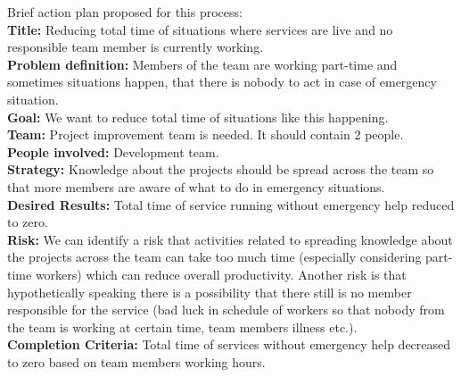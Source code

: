 Brief action plan proposed for this process: \\
\textbf{Title:} Reducing total time of situations where services are live and no responsible team member is currently working.\\
\textbf{Problem definition:} Members of the team are working part-time and sometimes situations happen, that there is nobody to act in case of emergency situation.\\
\textbf{Goal:}  We want to reduce total time of situations like this happening.\\
\textbf{Team:} Project improvement team is needed. It should contain 2 people.\\
\textbf{People involved:} Development team.\\
\textbf{Strategy:} Knowledge about the projects should be spread across the team so that more members are aware of what to do in emergency situations.\\
\textbf{Desired Results:} Total time of service running without emergency help reduced to zero.\\
\textbf{Risk:} We can identify a risk that activities related to spreading knowledge about the projects across the team can take too much time (especially considering part-time workers) which can reduce overall productivity. Another risk is that hypothetically speaking there is a possibility that there still is no member responsible for the service (bad luck in schedule of workers so that nobody from the team is working at certain time, team members illness etc.).\\
\textbf{Completion Criteria:} Total time of services without emergency help decreased to zero based on team members working hours.

